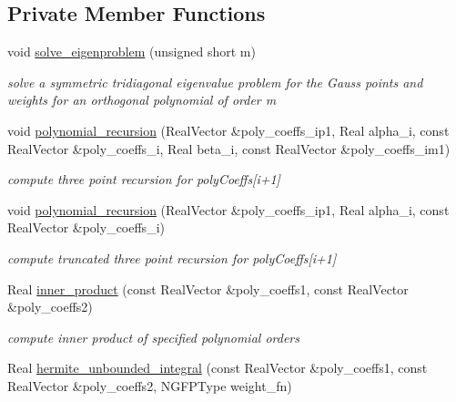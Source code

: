 \subsection*{Private Member Functions}
\begin{DoxyCompactItemize}
\item 
void \hyperlink{classPecos_1_1NumericGenOrthogPolynomial_a4695676473df7032b5cf8d8939fa63f2}{solve\+\_\+eigenproblem} (unsigned short m)
\begin{DoxyCompactList}\small\item\em solve a symmetric tridiagonal eigenvalue problem for the Gauss points and weights for an orthogonal polynomial of order m \end{DoxyCompactList}\item 
void \hyperlink{classPecos_1_1NumericGenOrthogPolynomial_a37403d7492f13f1482ba45befc66c886}{polynomial\+\_\+recursion} (Real\+Vector \&poly\+\_\+coeffs\+\_\+ip1, Real alpha\+\_\+i, const Real\+Vector \&poly\+\_\+coeffs\+\_\+i, Real beta\+\_\+i, const Real\+Vector \&poly\+\_\+coeffs\+\_\+im1)\label{classPecos_1_1NumericGenOrthogPolynomial_a37403d7492f13f1482ba45befc66c886}

\begin{DoxyCompactList}\small\item\em compute three point recursion for poly\+Coeffs\mbox{[}i+1\mbox{]} \end{DoxyCompactList}\item 
void \hyperlink{classPecos_1_1NumericGenOrthogPolynomial_aa23ca624e849bda93121c362fa281a11}{polynomial\+\_\+recursion} (Real\+Vector \&poly\+\_\+coeffs\+\_\+ip1, Real alpha\+\_\+i, const Real\+Vector \&poly\+\_\+coeffs\+\_\+i)\label{classPecos_1_1NumericGenOrthogPolynomial_aa23ca624e849bda93121c362fa281a11}

\begin{DoxyCompactList}\small\item\em compute truncated three point recursion for poly\+Coeffs\mbox{[}i+1\mbox{]} \end{DoxyCompactList}\item 
Real \hyperlink{classPecos_1_1NumericGenOrthogPolynomial_aa650c71abdded126ba7dccda064d1883}{inner\+\_\+product} (const Real\+Vector \&poly\+\_\+coeffs1, const Real\+Vector \&poly\+\_\+coeffs2)\label{classPecos_1_1NumericGenOrthogPolynomial_aa650c71abdded126ba7dccda064d1883}

\begin{DoxyCompactList}\small\item\em compute inner product of specified polynomial orders \end{DoxyCompactList}\item 
Real \hyperlink{classPecos_1_1NumericGenOrthogPolynomial_accf380ff2a3ff767346a92dc62048c1c}{hermite\+\_\+unbounded\+\_\+integral} (const Real\+Vector \&poly\+\_\+coeffs1, const Real\+Vector \&poly\+\_\+coeffs2, N\+G\+F\+P\+Type weight\+\_\+fn)\label{classPecos_1_1NumericGenOrthogPolynomial_accf380ff2a3ff767346a92dc62048c1c}


\end{DoxyCompactItemize}
